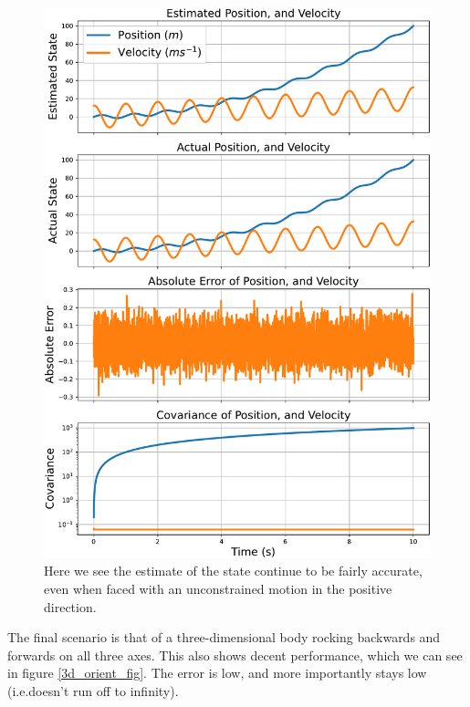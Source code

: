 \documentclass[12pt]{article}
\begin{document}
\begin{figure}[thp]
	\centering
	
	\includegraphics[width=\textwidth]{1d-velocity.pdf}
	
	\caption{Here we see the estimate of the state continue to be fairly accurate, even when faced with an unconstrained motion in the positive direction.}
	\label{1d_velocity_fig}
\end{figure}

The final scenario is that of a three-dimensional body rocking backwards and forwards on all three axes. This also shows decent performance, which we can see in figure \ref{3d_orient_fig}. The error is low, and more importantly stays low (i.e.\@ doesn't run off to infinity).
\end{document}
